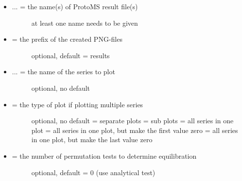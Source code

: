 \documentclass[letterpaper,10pt,english]{sphinxmanual}
\begin{document}
\begin{itemize}
\item {} \begin{description}
\item[{ ... = the name(s) of ProtoMS result file(s)}] \leavevmode
at least one name needs to be given

\end{description}

\item {} \begin{description}
\item[{ = the prefix of the created PNG-files}] \leavevmode
optional, default = results

\end{description}

\item {} \begin{description}
\item[{ ... = the name of the series to plot}] \leavevmode
optional, no default

\end{description}

\item {} \begin{description}
\item[{ = the type of plot if plotting multiple series}] \leavevmode
optional, no default
 = separate plots
 = sub plots
 = all series in one plot
 = all series in one plot, but make the first value zero
 = all series in one plot, but make the last value zero

\end{description}

\item {} \begin{description}
\item[{ = the number of permutation tests to determine equilibration}] \leavevmode
optional, default = 0 (use analytical test)

\end{description}


\end{itemize}
\end{document}
